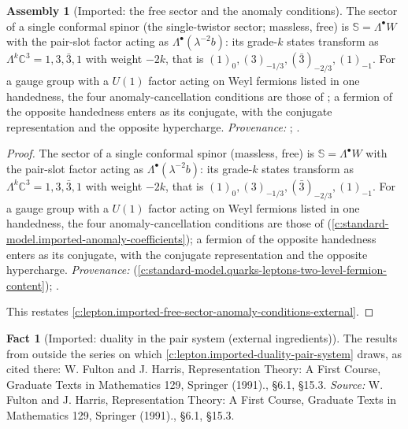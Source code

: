 \documentclass[11pt]{article}
\theoremstyle{definition}
\newtheorem{fact}[theorem]{Fact}
\newtheorem{assembled}[theorem]{Assembly}
\theoremstyle{plain}
\providecommand{\C}{}\renewcommand{\C}{\mathbb{C}}
\providecommand{\Sp}{}\renewcommand{\Sp}{\mathbb{S}}
\begin{document}
\begin{assembled}[Imported: the free sector and the anomaly conditions]\label{c:lepton.imported-free-sector-anomaly-conditions}
The sector of a single conformal spinor (the single-twistor sector; massless, free) is $\Sp = \Lambda^{\bullet}W$ with the pair-slot factor acting as $\Lambda^{\bullet}(\lambda^{-2}b)$: its grade-$k$ states transform as $\Lambda^{k}\C^{3} = 1, 3, \bar{3}, 1$ with weight $-2k$, that is $(1)_{0}, (3)_{-1/3}, (\bar{3})_{-2/3}, (1)_{-1}$. For a gauge group with a $U(1)$ factor acting on Weyl fermions listed in one handedness, the four anomaly-cancellation conditions are those of \cite[Fact~2.7]{ButlerT12}; a fermion of the opposite handedness enters as its conjugate, with the conjugate representation and the opposite hypercharge. \emph{Provenance:} \cite[Prop.~5.3(3), Fact~2.7]{ButlerT12}; \cite[\S 22.4]{WeinbergQFT1}.
\end{assembled}
\begin{proof}
The sector of a single conformal spinor (massless, free) is $\Sp = \Lambda^{\bullet}W$ with the pair-slot factor acting as $\Lambda^{\bullet}(\lambda^{-2}b)$: its grade-$k$ states transform as $\Lambda^{k}\C^{3} = 1, 3, \bar{3}, 1$ with weight $-2k$, that is $(1)_{0}, (3)_{-1/3}, (\bar{3})_{-2/3}, (1)_{-1}$. For a gauge group with a $U(1)$ factor acting on Weyl fermions listed in one handedness, the four anomaly-cancellation conditions are those of \cite[Fact~2.7]{ButlerT12} (\ref{c:standard-model.imported-anomaly-coefficients}); a fermion of the opposite handedness enters as its conjugate, with the conjugate representation and the opposite hypercharge. \emph{Provenance:} \cite[Prop.~5.3(3), Fact~2.7]{ButlerT12} (\ref{c:standard-model.quarks-leptons-two-level-fermion-content}); \cite[\S 22.4]{WeinbergQFT1}.

This restates \ref{c:lepton.imported-free-sector-anomaly-conditions-external}.

\end{proof}

\begin{fact}[Imported: duality in the pair system (external ingredients)]\label{c:lepton.imported-duality-pair-system-external}
The results from outside the series on which \ref{c:lepton.imported-duality-pair-system} draws, as cited there: W. Fulton and J. Harris, Representation Theory: A First Course, Graduate Texts in Mathematics 129, Springer (1991)., \S 6.1, \S 15.3.
\emph{Source:} W. Fulton and J. Harris, Representation Theory: A First Course, Graduate Texts in Mathematics 129, Springer (1991)., \S 6.1, \S 15.3.
\end{fact}
\end{document}
